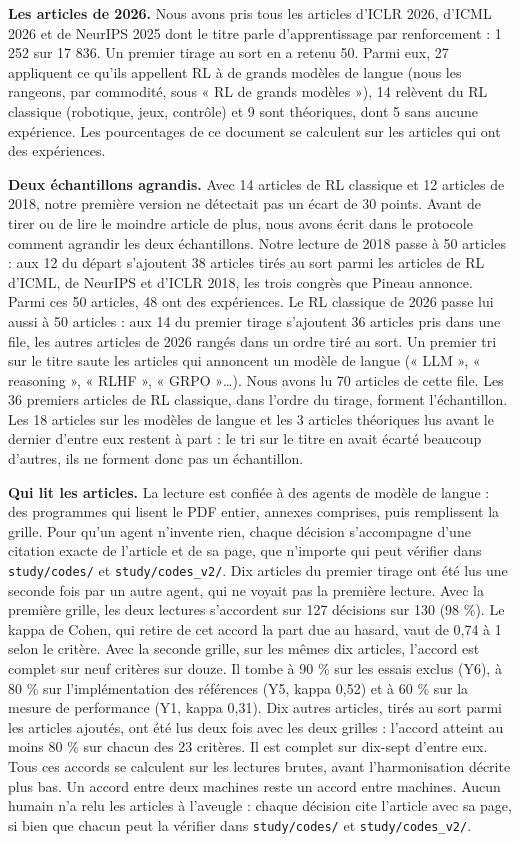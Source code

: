 \documentclass[11pt,a4paper]{article}
\begin{document}
\textbf{Les articles de 2026.} Nous avons pris tous les articles d'ICLR
2026, d'ICML 2026 et de NeurIPS 2025 dont le titre parle d'apprentissage
par renforcement : 1 252 sur 17 836. Un premier tirage au sort en a
retenu 50. Parmi eux, 27 appliquent ce qu'ils appellent RL à de grands
modèles de langue (nous les rangeons, par commodité, sous « RL de grands
modèles »), 14 relèvent du RL classique (robotique, jeux, contrôle) et 9
sont théoriques, dont 5 sans aucune expérience. Les pourcentages de ce
document se calculent sur les articles qui ont des expériences.

\textbf{Deux échantillons agrandis.} Avec 14 articles de RL classique et
12 articles de 2018, notre première version ne détectait pas un écart de
30 points. Avant de tirer ou de lire le moindre article de plus, nous
avons écrit dans le protocole comment agrandir les deux échantillons.
Notre lecture de 2018 passe à 50 articles : aux 12 du départ s'ajoutent
38 articles tirés au sort parmi les articles de RL d'ICML, de NeurIPS et
d'ICLR 2018, les trois congrès que Pineau annonce. Parmi ces 50
articles, 48 ont des expériences. Le RL classique de 2026 passe lui
aussi à 50 articles : aux 14 du premier tirage s'ajoutent 36 articles
pris dans une file, les autres articles de 2026 rangés dans un ordre
tiré au sort. Un premier tri sur le titre saute les articles qui
annoncent un modèle de langue (« LLM », « reasoning », « RLHF », « GRPO
»\ldots). Nous avons lu 70 articles de cette file. Les 36 premiers
articles de RL classique, dans l'ordre du tirage, forment l'échantillon.
Les 18 articles sur les modèles de langue et les 3 articles théoriques
lus avant le dernier d'entre eux restent à part : le tri sur le titre en
avait écarté beaucoup d'autres, ils ne forment donc pas un échantillon.

\textbf{Qui lit les articles.} La lecture est confiée à des agents de
modèle de langue : des programmes qui lisent le PDF entier, annexes
comprises, puis remplissent la grille. Pour qu'un agent n'invente rien,
chaque décision s'accompagne d'une citation exacte de l'article et de sa
page, que n'importe qui peut vérifier dans \texttt{study/codes/} et
\texttt{study/codes\_v2/}. Dix articles du premier tirage ont été lus
une seconde fois par un autre agent, qui ne voyait pas la première
lecture. Avec la première grille, les deux lectures s'accordent sur 127
décisions sur 130 (98 \%). Le kappa de Cohen, qui retire de cet accord
la part due au hasard, vaut de 0,74 à 1 selon le critère. Avec la
seconde grille, sur les mêmes dix articles, l'accord est complet sur
neuf critères sur douze. Il tombe à 90 \% sur les essais exclus (Y6), à
80 \% sur l'implémentation des références (Y5, kappa 0,52) et à 60 \%
sur la mesure de performance (Y1, kappa 0,31). Dix autres articles,
tirés au sort parmi les articles ajoutés, ont été lus deux fois avec les
deux grilles : l'accord atteint au moins 80 \% sur chacun des 23
critères. Il est complet sur dix-sept d'entre eux. Tous ces accords se
calculent sur les lectures brutes, avant l'harmonisation décrite plus
bas. Un accord entre deux machines reste un accord entre machines. Aucun
humain n'a relu les articles à l'aveugle : chaque décision cite
l'article avec sa page, si bien que chacun peut la vérifier dans
\texttt{study/codes/} et \texttt{study/codes\_v2/}.
\end{document}
